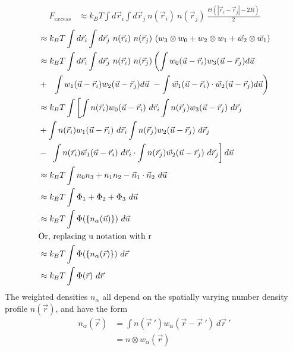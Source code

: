 \documentclass[double,12pt]{beavtex}
\begin{document}
\begin{align}      
     F_{excess} &\approx k_BT\int d\vec r_i \int d\vec r_j~n(\vec r_i)~n(\vec r_j)~\frac{\Theta(|\vec r_i-\vec r_j|-2R)}{2}                                                              
\end{align} 
\begin{align} 
                &\approx k_BT\int d\vec r_i \int d\vec r_j~n(\vec r_i)~n(\vec r_j)~(w_3\otimes w_0+ w_2 \otimes w_1+\vec {w}_2\otimes \vec {w}_1)  \\
                &\approx k_BT\int d\vec r_i \int d\vec r_j~n(\vec r_i)~n(\vec r_j)\left(\int w_0(\vec u - \vec r_i)w_3(\vec u - \vec r_j) d\vec u \color{white}\right)  \nonumber \\
                &+ \color{white}\left(\color{black}\int w_1(\vec u - \vec r_i)w_2(\vec u - \vec r_j) d\vec u ~-\int \vec {w}_1(\vec u - \vec r_i)\cdot\vec {w}_2(\vec u - \vec r_j) d\vec u\right)  \\  
                &\approx k_BT\int \left[\int n(\vec r_i) w_0(\vec u - \vec r_i)~d\vec r_i \int n(\vec r_j) w_3(\vec u - \vec r_j)~d\vec r_j \color{white}\right]  \nonumber \\
                &+ \int n(\vec r_i) w_1(\vec u - \vec r_i)~d\vec r_i \int n(\vec r_j) w_2(\vec u - \vec r_j)~d\vec r_j  \nonumber \\
                &- \color{white}\left[\color{black} \int n(\vec r_i) \vec {w}_1(\vec u - \vec r_i)~d\vec r_i \cdot \int n(\vec r_j) \vec {w}_2(\vec u - \vec r_j)~d\vec r_j \right]\color{black}d\vec u  \\              
                &\approx k_BT\int n_0n_3 + n_1n_2 - \vec n_1\cdot\vec n_2~d\vec u  \label{Fexlowden-inhomo}  \\                
                &\approx k_BT\int \Phi_1 + \Phi_2 + \Phi_3~d\vec u  \\
                &\approx k_BT\int \Phi(\{n_\alpha(\vec u)\})~d\vec u  \\
                &\text{Or, replacing u notation with r} \nonumber \\
                &\approx k_BT\int \Phi(\{n_\alpha(\vec r)\})~d\vec r  \\
                &\approx k_BT\int \Phi(\vec r)~d\vec r             
\end{align}
The weighted densities $n_\alpha$ all depend on the spatially varying 
number density profile $n(\vec r)$, and have the form
\begin{align}
    n_\alpha(\vec r) &= \int n(\vec {r}~')w_\alpha(\vec r-\vec {r}~')~d\vec {r}~'  \label{weighted_densities}  \\
                     &= n\otimes w_\alpha(\vec r)
\end{align}  
\end{document}
